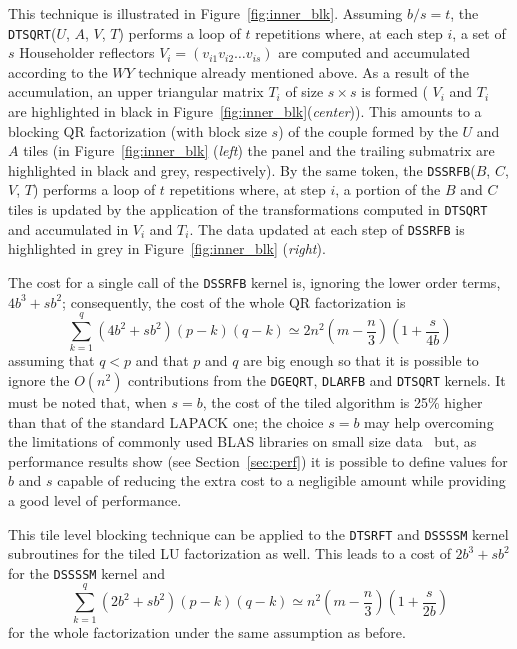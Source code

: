 \documentclass{article}
\begin{document}
This technique is illustrated in Figure~\ref{fig:inner_blk}. Assuming
$b/s = t$, the \texttt{DTSQRT}($U$, $A$, $V$, $T$) performs a loop of
$t$ repetitions where, at each step $i$, a set of $s$ Householder
reflectors $V_{i}=(v_{i1} v_{i2} \dots v_{is})$ are computed and
accumulated according to the $WY$ technique already mentioned
above. As a result of the accumulation, an upper triangular matrix
$T_i$ of size $s\times s$ is formed ( $V_i$ and $T_i$ are highlighted
in black in Figure~\ref{fig:inner_blk}({\it center})). This amounts to
a blocking QR factorization (with block size $s$) of the couple formed
by the $U$ and $A$ tiles (in Figure~\ref{fig:inner_blk} ({\it left})
the panel and the trailing submatrix are highlighted in black and
grey, respectively).  By the same token, the \texttt{DSSRFB}($B$, $C$,
$V$, $T$) performs a loop of $t$ repetitions where, at step $i$, a
portion of the $B$ and $C$ tiles is updated by the application of the
transformations computed in \texttt{DTSQRT} and accumulated in $V_i$
and $T_i$. The data updated at each step of \texttt{DSSRFB} is
highlighted in grey in Figure~\ref{fig:inner_blk} ({\it right}).

The cost for a single call of the \texttt{DSSRFB} kernel is, ignoring
the lower order terms, $4b^3 + sb^2$; consequently, the cost of
the whole QR factorization is
\begin{displaymath}
  \sum_{k=1}^q (4b^2+sb^2)(p-k)(q-k) \simeq 2n^2(m-\frac{n}{3})(1+\frac{s}{4b})
\end{displaymath}
assuming that $q<p$ and that $p$ and $q$ are big enough so that it is
possible to ignore the $O(n^2)$ contributions from the
\texttt{DGEQRT}, \texttt{DLARFB} and \texttt{DTSQRT} kernels. It must
be noted that, when $s=b$, the cost of the tiled algorithm is 25\%
higher than that of the standard LAPACK one; the choice $s=b$ may help
overcoming the limitations of commonly used BLAS libraries on small
size data~\cite{tiledqr} but, as performance results show (see
Section~\ref{sec:perf}) it is possible to define values for $b$ and
$s$ capable of reducing the extra cost to a negligible amount while
providing a good level of performance.

This tile level blocking technique can be applied to the
\texttt{DTSRFT} and \texttt{DSSSSM} kernel subroutines for the tiled
LU factorization as well. This leads to a cost of $2b^3+sb^2$ for the
\texttt{DSSSSM} kernel and
\begin{displaymath}
  \sum_{k=1}^q (2b^2+sb^2)(p-k)(q-k) \simeq n^2(m-\frac{n}{3})(1+\frac{s}{2b})
\end{displaymath}
for the whole factorization under the same assumption as before.
\end{document}
